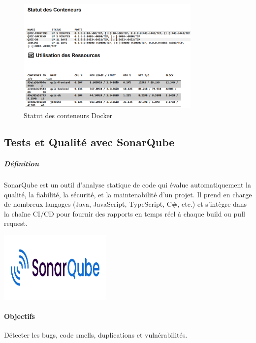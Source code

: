 \documentclass[12pt,a4paper,twoside,openright]{report}
\begin{document}
\begin{figure}[H]
\centering
\includegraphics[width=0.8\textwidth]{latex_media/media/image40.png}
\caption{Statut des conteneurs Docker}
\label{fig:statut-conteneurs}
\end{figure}

\hypertarget{tests-et-qualituxe9-avec-sonarqube}{%
\subsection{Tests et Qualité avec
SonarQube}\label{tests-et-qualituxe9-avec-sonarqube}}

\hypertarget{duxe9finition}{%
\subparagraph{Définition}\label{duxe9finition}}

SonarQube est un outil d'analyse statique de code qui évalue
automatiquement la qualité, la fiabilité, la sécurité, et la
maintenabilité d'un projet. Il prend en charge de nombreux langages
(Java, JavaScript, TypeScript, C\#, etc.) et s'intègre dans la chaîne
CI/CD pour fournir des rapports en temps réel à chaque build ou pull
request.

\includegraphics[width=2.17222in,height=1.36111in]{latex_media/media/image41.png}

\hypertarget{objectifs}{%
\paragraph{\texorpdfstring{ Objectifs}{ Objectifs}}\label{objectifs}}

Détecter les bugs, code smells, duplications et vulnérabilités.
\end{document}
